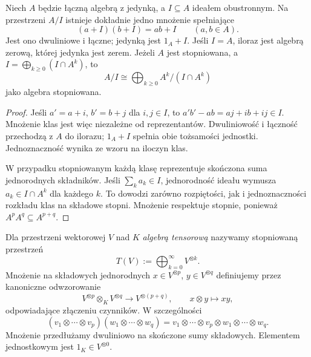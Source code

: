 \begin{stwierdzenie}
\label{prop:lin10-iloraz-algebry}
Niech \(A\) będzie łączną algebrą z jedynką,
a \(I\subseteq A\) ideałem obustronnym.
Na przestrzeni \(A/I\) istnieje dokładnie jedno
mnożenie spełniające
\[
 (a+I)(b+I)=ab+I\qquad(a,b\in A).
\]
Jest ono dwuliniowe i łączne; jedynką jest
\(1_A+I\). Jeśli \(I=A\), iloraz jest
algebrą zerową, której jedynka jest zerem.
Jeżeli \(A\) jest stopniowana, a
\(I=\bigoplus_{k\geq0}(I\cap A^k)\), to
\[
 A/I\cong\bigoplus_{k\geq0}
       A^k/(I\cap A^k)
\]
jako algebra stopniowana.
\end{stwierdzenie}
\begin{proof}
Jeśli \(a'=a+i\), \(b'=b+j\)
dla \(i,j\in I\), to
\(a'b'-ab=aj+ib+ij\in I\).
Mnożenie klas jest więc niezależne od
reprezentantów. Dwuliniowość i łączność
przechodzą z \(A\) do ilorazu;
\(1_A+I\) spełnia obie tożsamości jednostki.
Jednoznaczność wynika ze wzoru na iloczyn klas.

W przypadku stopniowanym każdą klasę
reprezentuje skończona suma
jednorodnych składników. Jeśli
\(\sum_k a_k\in I\), jednorodność ideału
wymusza \(a_k\in I\cap A^k\)
dla każdego \(k\). To dowodzi zarówno
rozpiętości, jak i jednoznaczności
rozkładu klas na składowe stopni.
Mnożenie respektuje stopnie,
ponieważ \(A^pA^q\subseteq A^{p+q}\).
\end{proof}

\begin{definicja}
\label{def:lin10-tensorowa}
Dla przestrzeni wektorowej \(V\) nad \(K\)
\emph{algebrą tensorową} nazywamy
stopniowaną przestrzeń
\[
 T(V):=\bigoplus_{k=0}^{\infty}V^{\otimes k}.
\]
Mnożenie na składowych jednorodnych
\(x\in V^{\otimes p}\),
\(y\in V^{\otimes q}\) definiujemy
przez kanoniczne odwzorowanie
\[
 V^{\otimes p}\otimes_K V^{\otimes q}
 \longrightarrow V^{\otimes(p+q)},
 \qquad x\otimes y\longmapsto xy,
\]
odpowiadające złączeniu czynników.
W szczególności
\[
 (v_1\otimes\cdots\otimes v_p)
 (w_1\otimes\cdots\otimes w_q)
 =v_1\otimes\cdots\otimes v_p
  \otimes w_1\otimes\cdots\otimes w_q.
\]
Mnożenie przedłużamy dwuliniowo na
skończone sumy składowych.
Elementem jednostkowym jest \(1_K\in V^{\otimes0}\).
\end{definicja}

